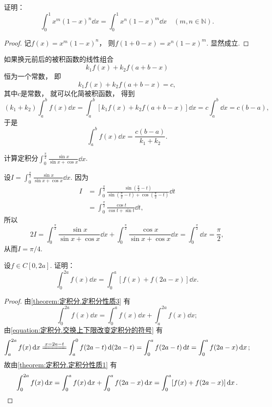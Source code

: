 \begin{example}
证明：\begin{equation}
	\int_0^1 x^m (1-x)^n \dd{x}
	= \int_0^1 x^n (1-x)^m \dd{x}
	\quad(m,n\in\mathbb{N}).
\end{equation}
\begin{proof}
记\(f(x) = x^m (1-x)^n\)，
则\(f(1+0-x) = x^n (1-x)^m\).
显然成立.
\end{proof}
\end{example}

如果换元前后的被积函数的线性组合\[
	k_1 f(x) + k_2 f(a+b-x)
\]恒为一个常数，
即\[
	k_1 f(x) + k_2 f(a+b-x) = c,
\]
其中\(c\)是常数，
就可以化简被积函数，
得到\[
	(k_1 + k_2) \int_a^b f(x) \dd{x}
	= \int_a^b [k_1 f(x) + k_2 f(a+b-x)] \dd{x}
	= c \int_a^b \dd{x} = c(b-a),
\]
于是\[
	\int_a^b f(x) \dd{x}
	= \frac{c(b-a)}{k_1 + k_2}.
\]

\begin{example}
计算定积分\(\int_0^{\frac{\pi}{2}} \frac{\sin x}{\sin x + \cos x} \dd{x}\).
\begin{solution}
设\(I = \int_0^{\frac{\pi}{2}} \frac{\sin x}{\sin x + \cos x} \dd{x}\).
因为
\begin{align*}
	I &= \int_0^{\frac{\pi}{2}}
		\frac{\sin\left(\frac{\pi}{2}-t\right)}
			{\sin\left(\frac{\pi}{2}-t\right) + \cos\left(\frac{\pi}{2}-t\right)}
		\dd{t} \\
	&= \int_0^{\frac{\pi}{2}} \frac{\cos t}{\cos t + \sin t} \dd{t},
\end{align*}
所以\[
	2 I = \int_0^{\frac{\pi}{2}} \frac{\sin x}{\sin x + \cos x} \dd{x}
		+ \int_0^{\frac{\pi}{2}} \frac{\cos x}{\sin x + \cos x} \dd{x}
	= \int_0^{\frac{\pi}{2}} \dd{x}
	= \frac{\pi}{2},
\]
从而\(I = \pi/4\).
\end{solution}
\end{example}

\begin{example}
设\(f \in C[0,2a]\).
证明：\begin{equation}
	\int_0^{2a} f(x) \dd{x} = \int_0^a [f(x) + f(2a-x)] \dd{x}.
\end{equation}
\begin{proof}
由\cref{theorem:定积分.定积分性质3} 有\[
	\int_0^{2a} f(x) \dd{x}
	= \int_0^a f(x) \dd{x} + \int_a^{2a} f(x) \dd{x};
\]
由\cref{equation:定积分.交换上下限改变定积分的符号} 有\[
	\int_a^{2a} f(x) \dd{x}
	\xlongequal{x=2a-t} \int_a^0 f(2a-t) \dd(2a-t)
	= \int_0^a f(2a-t) \dd{t}
	= \int_0^a f(2a-x) \dd{x};
\]
故由\cref{theorem:定积分.定积分性质1} 有\[
	\int_0^{2a} f(x) \dd{x}
	= \int_0^a f(x) \dd{x} + \int_0^a f(2a-x) \dd{x}
	= \int_0^a [f(x) + f(2a-x)] \dd{x}.
	\qedhere
\]
\end{proof}
\end{example}
